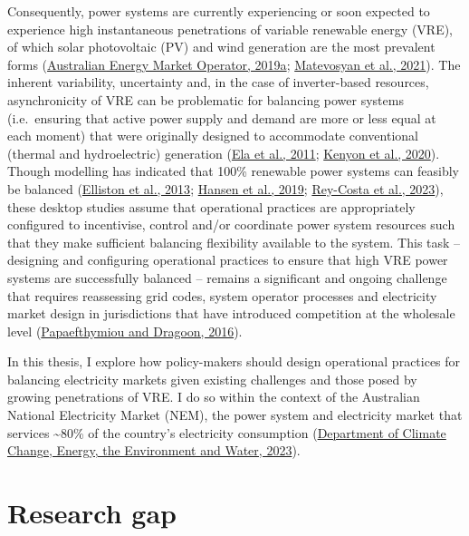 \documentclass[12pt,a4paper,]{report}
\begin{document}
Consequently, power systems are currently experiencing or soon expected
to experience high instantaneous penetrations of variable renewable
energy (VRE), of which solar photovoltaic (PV) and wind generation are
the most prevalent forms
(\protect\hyperlink{ref-australianenergymarketoperatorMaintainingPowerSystem2019}{Australian
Energy Market Operator, 2019a};
\protect\hyperlink{ref-matevosyanFutureInverterBasedResources2021}{Matevosyan
et al., 2021}). The inherent variability, uncertainty and, in the case
of inverter-based resources, asynchronicity of VRE can be problematic
for balancing power systems (i.e.~ensuring that active power supply and
demand are more or less equal at each moment) that were originally
designed to accommodate conventional (thermal and hydroelectric)
generation (\protect\hyperlink{ref-elaOperatingReservesVariable2011}{Ela
et al., 2011};
\protect\hyperlink{ref-kenyonStabilityControlPower2020}{Kenyon et al.,
2020}). Though modelling has indicated that 100\% renewable power
systems can feasibly be balanced
(\protect\hyperlink{ref-ellistonLeastCost1002013}{Elliston et al.,
2013}; \protect\hyperlink{ref-hansenStatusPerspectives1002019}{Hansen et
al., 2019};
\protect\hyperlink{ref-rey-costaFirming100Renewable2023}{Rey-Costa et
al., 2023}), these desktop studies assume that operational practices are
appropriately configured to incentivise, control and/or coordinate power
system resources such that they make sufficient balancing flexibility
available to the system. This task -- designing and configuring
operational practices to ensure that high VRE power systems are
successfully balanced -- remains a significant and ongoing challenge
that requires reassessing grid codes, system operator processes and
electricity market design in jurisdictions that have introduced
competition at the wholesale level
(\protect\hyperlink{ref-papaefthymiou100RenewableEnergy2016}{Papaefthymiou
and Dragoon, 2016}).

In this thesis, I explore how policy-makers should design operational
practices for balancing electricity markets given existing challenges
and those posed by growing penetrations of VRE. I do so within the
context of the Australian National Electricity Market (NEM), the power
system and electricity market that services \textasciitilde80\% of the
country's electricity consumption
(\protect\hyperlink{ref-departmentofclimatechangeenergytheenvironmentandwaterNationalElectricityMarket2023}{Department
of Climate Change, Energy, the Environment and Water, 2023}).

\hypertarget{sec:intro-research_gap}{%
\section{Research gap}\label{sec:intro-research_gap}}
\end{document}
